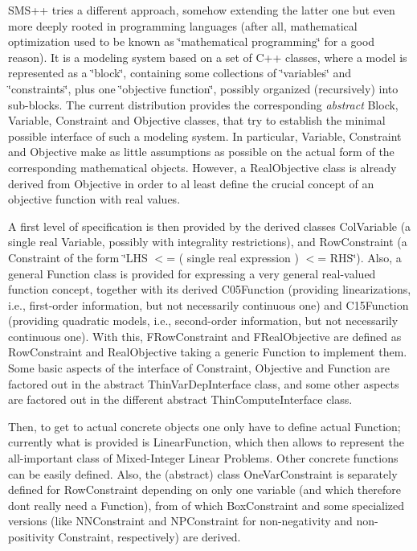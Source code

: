 S\+M\+S++ tries a different approach, somehow extending the latter one but even more deeply rooted in programming languages (after all, mathematical optimization used to be known as \char`\"{}mathematical programming\char`\"{} for a good reason). It is a modeling system based on a set of C++ classes, where a model is represented as a \char`\"{}block\char`\"{}, containing some collections of \char`\"{}variables\char`\"{} and \char`\"{}constraints\char`\"{}, plus one \char`\"{}objective function\char`\"{}, possibly organized (recursively) into sub-\/blocks. The current distribution provides the corresponding {\itshape abstract} Block, Variable, Constraint and Objective classes, that try to establish the minimal possible interface of such a modeling system. In particular, Variable, Constraint and Objective make as little assumptions as possible on the actual form of the corresponding mathematical objects. However, a Real\+Objective class is already derived from Objective in order to al least define the crucial concept of an objective function with real values.

A first level of specification is then provided by the derived classes Col\+Variable (a single real Variable, possibly with integrality restrictions), and Row\+Constraint (a Constraint of the form \char`\"{}\+L\+H\+S $<$= ( single
real expression ) $<$= R\+H\+S\char`\"{}). Also, a general Function class is provided for expressing a very general real-\/valued function concept, together with its derived C05\+Function (providing linearizations, i.\+e., first-\/order information, but not necessarily continuous one) and C15\+Function (providing quadratic models, i.\+e., second-\/order information, but not necessarily continuous one). With this, F\+Row\+Constraint and F\+Real\+Objective are defined as Row\+Constraint and Real\+Objective taking a generic Function to implement them. Some basic aspects of the interface of Constraint, Objective and Function are factored out in the abstract Thin\+Var\+Dep\+Interface class, and some other aspects are factored out in the different abstract Thin\+Compute\+Interface class.

Then, to get to actual concrete objects one only have to define actual Function; currently what is provided is Linear\+Function, which then allows to represent the all-\/important class of Mixed-\/\+Integer Linear Problems. Other concrete functions can be easily defined. Also, the (abstract) class One\+Var\+Constraint is separately defined for Row\+Constraint depending on only one variable (and which therefore don\textquotesingle{}t really need a Function), from of which Box\+Constraint and some specialized versions (like N\+N\+Constraint and N\+P\+Constraint for non-\/negativity and non-\/positivity Constraint, respectively) are derived.

